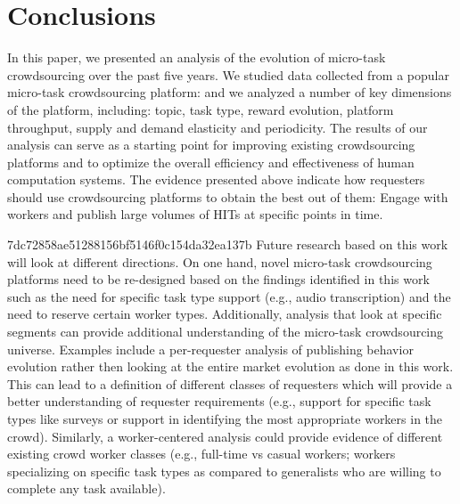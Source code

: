 \section{Conclusions}\label{sec:conc}

In this paper, we presented an analysis of the evolution of micro-task crowdsourcing over the past five years.
We studied data collected from a popular micro-task crowdsourcing platform: \amt{}
and we analyzed a number of key dimensions of the platform, including: topic, task type,  reward evolution, platform throughput, supply and demand elasticity and periodicity. The results of our analysis can serve as a starting point for improving existing crowdsourcing platforms and to optimize the overall efficiency and effectiveness of human computation systems. The evidence presented above  indicate how requesters should use crowdsourcing platforms to obtain the best out of them: Engage with workers and publish large volumes of HITs at specific points in time. 


7dc72858ae51288156bf5146f0c154da32ea137b
Future research based on this work will look at different directions. On one hand, novel micro-task crowdsourcing platforms need to be re-designed based on the findings identified in this work such as the need for specific task type support (e.g., audio transcription) and the need to reserve certain worker types.
% 
Additionally, analysis that look at specific segments can provide additional understanding of the micro-task crowdsourcing universe. Examples include a per-requester analysis of publishing behavior evolution rather then looking at the entire market evolution as done in this work. This can lead to a definition of different classes of requesters which will provide a better understanding of requester requirements (e.g., support for specific task types like surveys or support in identifying the most appropriate workers in the crowd). Similarly, a worker-centered analysis could provide evidence of different existing crowd worker classes (e.g., full-time vs casual workers; workers specializing on specific task types as compared to generalists  who are willing to complete any task available).